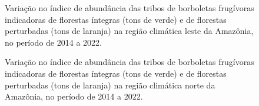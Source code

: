 \documentclass[
  letterpaper,
]{scrbook}
\begin{document}
\begin{figure}[H]


\caption{\label{fig-IA-areas-abertas-regiao-climatica-leste-amazonica}Variação
no índice de abundância das tribos de borboletas frugívoras indicadoras
de florestas íntegras (tons de verde) e de florestas perturbadas (tons
de laranja) na região climática leste da Amazônia, no período de 2014 a
2022.}

\end{figure}%

\begin{figure}[H]


\caption{\label{fig-IA-regiao-climatica-sudoeste-amazonica}Variação no
índice de abundância das tribos de borboletas frugívoras indicadoras de
florestas íntegras (tons de verde) e de florestas perturbadas (tons de
laranja) na região climática norte da Amazônia, no período de 2014 a
2022.}

\end{figure}%
\end{document}
